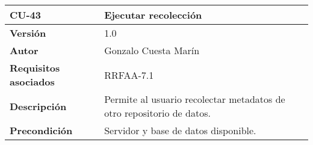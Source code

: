 \begin{longtable}[]{@{}ll@{}}
\toprule
\begin{minipage}[b]{0.18\columnwidth}\raggedright
\textbf{CU-43}\strut
\end{minipage} & \begin{minipage}[b]{0.76\columnwidth}\raggedright
\textbf{Ejecutar recolección}\strut
\end{minipage}\tabularnewline
\midrule
\endhead
\begin{minipage}[t]{0.18\columnwidth}\raggedright
\textbf{Versión}\strut
\end{minipage} & \begin{minipage}[t]{0.76\columnwidth}\raggedright
1.0\strut
\end{minipage}\tabularnewline
\begin{minipage}[t]{0.18\columnwidth}\raggedright
\textbf{Autor}\strut
\end{minipage} & \begin{minipage}[t]{0.76\columnwidth}\raggedright
Gonzalo Cuesta Marín\strut
\end{minipage}\tabularnewline
\begin{minipage}[t]{0.18\columnwidth}\raggedright
\textbf{Requisitos asociados}\strut
\end{minipage} & \begin{minipage}[t]{0.76\columnwidth}\raggedright
RRFAA-7.1\strut
\end{minipage}\tabularnewline
\begin{minipage}[t]{0.18\columnwidth}\raggedright
\textbf{Descripción}\strut
\end{minipage} & \begin{minipage}[t]{0.76\columnwidth}\raggedright
Permite al usuario recolectar metadatos de otro repositorio de
datos.\strut
\end{minipage}\tabularnewline
\begin{minipage}[t]{0.18\columnwidth}\raggedright
\textbf{Precondición}\strut
\end{minipage} & \begin{minipage}[t]{0.76\columnwidth}\raggedright
Servidor y base de datos disponible.


\end{minipage}
\end{longtable}
